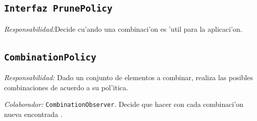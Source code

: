 \documentclass[a4paper,10pt,twoside]{article}
\begin{document}
        
 
        
        \subsection{\texttt{Interfaz PrunePolicy}}
        \textit{Responsabilidad:}Decide cu'ando una combinaci'on es 'util para la aplicaci'on.

        \subsection{\texttt{CombinationPolicy}}
        \textit{Responsabilidad:} Dado un conjunto de elementos a combinar, realiza las posibles combinaciones de acuerdo a su pol'itica.
		 
	 \textit{Colaborador:} \texttt{CombinationObserver}. Decide que hacer con cada combinaci'on nueva encontrada .\\   
\end{document}
